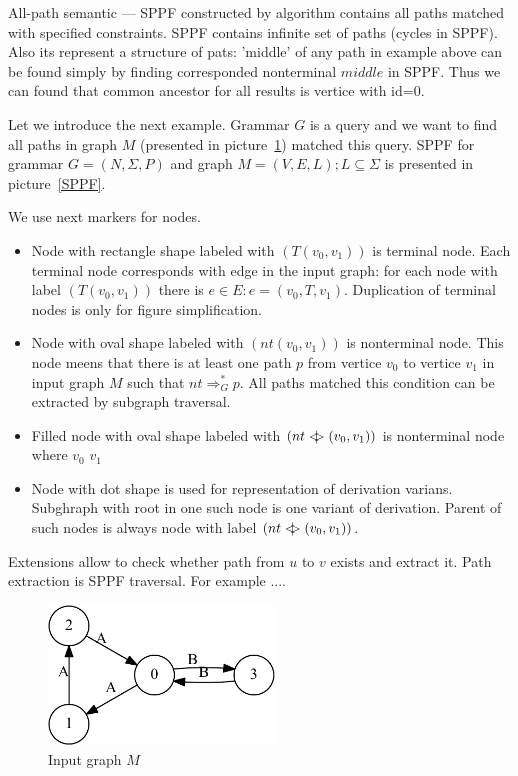 \documentclass{sig-alternate} %
\begin{document}
All-path semantic --- SPPF constructed by algorithm contains all paths matched with specified constraints. SPPF contains infinite set of paths (cycles in SPPF). 
Also its represent a structure of pats: 'middle' of any path in example above can be found simply by finding corresponded nonterminal $middle$ in SPPF.
Thus we can found that common ancestor for all results is vertice with id=$0$. 


Let we introduce the next example. Grammar $G$ is a query and we want to find all paths in graph $M$ (presented in picture~\ref{input}) matched this query.
SPPF for grammar $G = (N, \Sigma ,P)$ and graph $M = (V,E,L); L \subseteq \Sigma$ is presented in picture~\ref{SPPF}. 

We use next markers for nodes.
\begin{itemize}
    \item Node with rectangle shape labeled with $(T (v_0, v_1))$ is terminal node. 
    Each terminal node corresponds with edge in the input graph: for each node with label $(T (v_0, v_1))$ there is $e\in E: e=(v_0,T,v_1)$.
    Duplication of terminal nodes is only for figure simplification.
    \item Node with oval shape labeled with $(nt (v_0, v_1))$ is nonterminal node. 
    This node meens that there is at least one path $p$ from vertice $v_0$ to vertice $v_1$ in input graph $M$ such that $nt \Rightarrow^*_G p$.
    All paths matched this condition can be extracted by subgraph traversal. 
    \item Filled node with oval shape labeled with $(nt <\mkern-11mu | \mkern-11mu> (v_0, v_1))$ is nonterminal node where $v_0$ $v_1$    
    \item Node with dot shape is used for representation of derivation varians. Subghraph with root in one such node is one variant of derivation. Parent of such nodes is always node with label $(nt <\mkern-11mu | \mkern-11mu> (v_0, v_1))$.
\end{itemize}

Extensions allow to check whether path from $u$ to $v$ exists and extract it. Path extraction is SPPF traversal. For example ....

\begin{figure}[h]
    \begin{center}
        \includegraphics[width=6cm]{dot/input.pdf}
        \caption{Input graph $M$}
        \label{input}        
    \end{center}
\end{figure}
\end{document}
